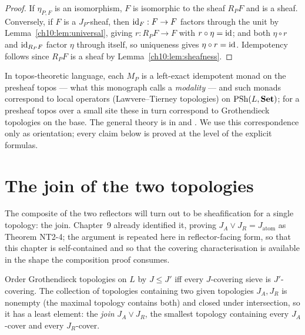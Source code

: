 \begin{proof}
If $\eta_{P, F}$ is an isomorphism, $F$ is isomorphic to the sheaf $R_P F$
and is a sheaf. Conversely, if $F$ is a $J_P$-sheaf, then $\mathrm{id}_F : F \to F$
factors through the unit by Lemma~\ref{ch10:lem:universal}, giving
$r : R_P F \to F$ with $r \circ \eta = \mathrm{id}$; and both
$\eta \circ r$ and $\mathrm{id}_{R_P F}$ factor $\eta$ through itself, so uniqueness
gives $\eta \circ r = \mathrm{id}$. Idempotency follows since $R_P F$ is a sheaf by
Lemma~\ref{ch10:lem:sheafness}.
\end{proof}

\begin{remark}
\label{ch10:rem:johnstone}
In topos-theoretic language, each $M_P$ is a left-exact idempotent monad on
the presheaf topos --- what this monograph calls a \emph{modality} --- and
such monads correspond to local operators (Lawvere--Tierney topologies) on
$\mathrm{PSh}(L, \mathbf{Set})$; for a presheaf topos over a small site these in turn
correspond to Grothendieck topologies on the base. The general theory is in
\cite{johnstone} and \cite[Chapter~V]{maclane}. We use this correspondence
only as orientation; every claim below is proved at the level of the explicit
formulas.
\end{remark}

\section{The join of the two topologies}
\label{ch10:sec:join}

The composite of the two reflectors will turn out to be sheafification for a
single topology: the join. Chapter~9 already identified it, proving
$J_A \vee J_R = J_{\mathrm{atom}}$ as Theorem NT2-4; the argument is repeated
here in reflector-facing form, so that this chapter is self-contained and so
that the covering characterisation is available in the shape the composition
proof consumes.

\begin{definition}
\label{ch10:def:join}
Order Grothendieck topologies on $L$ by $J \le J'$ iff every $J$-covering
sieve is $J'$-covering. The collection of topologies containing two given
topologies $J_A, J_R$ is nonempty (the maximal topology contains both) and
closed under intersection, so it has a least element: the \emph{join}
$J_A \vee J_R$, the smallest topology containing every $J_A$-cover and every
$J_R$-cover.
\end{definition}

